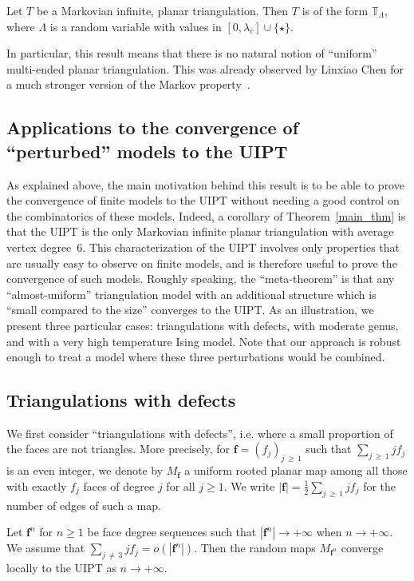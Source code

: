 \documentclass[AHL,Unicode,longabstracts,published]{cedram}
\newcommand{\TT}{\mathbb{T}}
\newcommand{\bff}{\mathbf{f}}
\begin{document}
\begin{theo}\label{main_thm}
Let $T$ be a Markovian infinite, planar triangulation. Then $T$ is of the form $\TT_{\Lambda}$, where $\Lambda$ is a random variable with values in $[0,\lambda_c] \cup \{ \star \}$.
\end{theo}

In particular, this result means that there is no natural notion of ``uniform'' multi-ended planar triangulation. This was already observed by Linxiao Chen for a much stronger version of the Markov property~\cite{ChPerso}.

\subsection*{Applications to the convergence of ``perturbed'' models to the UIPT}
As explained above, the main motivation behind this result is to be able to prove the convergence of finite models to the UIPT without needing a good control on the combinatorics of these models. Indeed, a corollary of Theorem~\ref{main_thm} is that the UIPT is the only Markovian infinite planar triangulation with average vertex degree~$6$. This characterization of the UIPT involves only properties that are usually easy to observe on finite models, and is therefore useful to prove the convergence of such models. Roughly speaking, the ``meta-theorem'' is that any ``almost-uniform'' triangulation model with an additional structure which is ``small compared to the size'' converges to the UIPT. As an illustration, we present three particular cases: triangulations with defects, with moderate genus, and with a very high temperature Ising model. Note that our approach is robust enough to treat a model where these three perturbations would be combined.

\subsection*{Triangulations with defects}
We first consider ``triangulations with defects'', i.e. where a small proportion of the faces are not triangles. More precisely, for $\bff=(f_j)_{j\,\geq\,1}$ such that $\sum_{j\,\geq\,1} j f_j$ is an even integer, we denote by $M_{\bff}$ a uniform rooted planar map among all those with exactly $f_j$ faces of degree $j$ for all $j \geq 1$. We write $|\bff|=\frac{1}{2} \sum_{j\,\geq\,1} j f_j$ for the number of edges of such a map.

\begin{coro}\label{cor_triang_with_defects}
Let $\bff^n$ for $n \geq 1$ be face degree sequences such that $|\bff^n| \to +\infty$ when $n \to +\infty$. We assume that $\sum_{j\,\ne\,3} j f_j = o (|\bff^n|)$. Then the random maps $M_{\bff^n}$ converge locally to the UIPT as $n \to +\infty$.
\end{coro}
\end{document}
